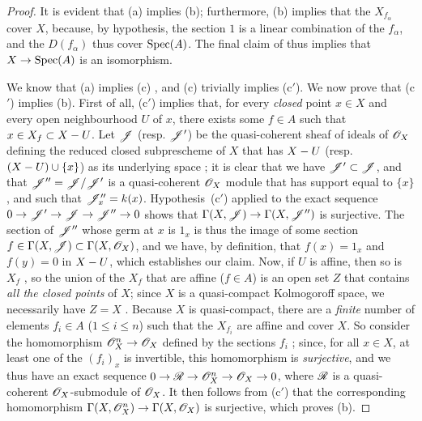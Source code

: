 \begin{proof}
It is evident that (a) implies (b); furthermore, (b) implies that the $X_{f_\alpha}$ cover $X$, because, by hypothesis, the section $1$ is a linear combination of the $f_\alpha$, and the $D(f_\alpha)$ thus cover $\operatorname{Spec}(A)$.
The final claim of  thus implies that $X\to\Spec(A)$ is an isomorphism.

We know that (a) implies (c) , and (c) trivially implies (c$'$).
We now prove that (c$'$) implies (b).
First of all, (c$'$) implies that, for every \emph{closed} point $x\in X$ and every open neighbourhood $U$ of $x$, there exists some $f\in A$ such that $x\in X_f\subset X- U$.
Let $\mathscr{J}$ (resp. $\mathscr{J}'$) be the quasi-coherent sheaf of ideals of $\mathscr{O}_X$ defining the reduced closed subprescheme of $X$ that has $X- U$ (resp. $(X- U)\cup\{x\}$) as its underlying space ;
it is clear that we have $\mathscr{J}'\subset\mathscr{J}$, and that $\mathscr{J}''=\mathscr{J}/\mathscr{J}'$ is a quasi-coherent $\mathscr{O}_X$ module that has support equal to $\{x\}$, and such that $\mathscr{J}_x''=k(x)$.
Hypothesis~(c$'$) applied to the exact sequence $0\to\sh{J}'\to\sh{J}\to\sh{J}''\to0$ shows that $\Gamma(X,\sh{J})\to\Gamma(X,\sh{J}'')$ is surjective.
The section of $\mathscr{J}''$ whose germ at $x$ is $1_x$ is thus the image of some section $f\in\Gamma(X,\mathscr{J})\subset\Gamma(X,\mathscr{O}_X)$, and we have, by definition, that $f(x)=1_x$ and $f(y)=0$ in $X- U$, which establishes our claim.
Now, if $U$ is affine, then so is $X_f$ , so the union of the $X_f$ that are affine ($f\in A$) is an open set $Z$ that contains \emph{all the closed points} of $X$;
since $X$ is a quasi-compact Kolmogoroff space, we necessarily have $Z=X$ .
Because $X$ is quasi-compact, there are a \emph{finite} number of elements $f_i\in A$ ($1\leq i\leq n$) such that the $X_{f_i}$ are affine and cover $X$.
So consider the homomorphism $\sh{O}_X^n\to\sh{O}_X$ defined by the sections $f_i$ ;
since, for all $x\in X$, at least one of the $(f_i)_x$ is invertible, this homomorphism is \emph{surjective}, and we thus have an exact sequence $0\to\sh{R}\to\sh{O}_X^n\to\sh{O}_X\to0$, where $\mathscr{R}$ is a quasi-coherent $\mathscr{O}_X$-submodule of $\mathscr{O}_X$.
It then follows
from (c$'$) that the corresponding homomorphism $\Gamma(X,\sh{O}_X^n)\to\Gamma(X,\sh{O}_X)$ is surjective, which proves (b).


\end{proof}

